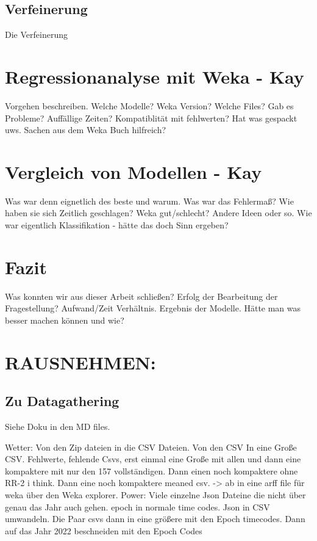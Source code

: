 \documentclass[letterpaper]{article} %
\begin{document}
    \subsection*{Verfeinerung}
        Die Verfeinerung
\section*{Regressionanalyse mit Weka - Kay}
    Vorgehen beschreiben. Welche Modelle? Weka Version? Welche Files? Gab es Probleme? Auffällige Zeiten? Kompatiblität mit fehlwerten? Hat was gespackt uws. Sachen aus dem Weka Buch hilfreich?
\section*{Vergleich von Modellen - Kay}
    Was war denn eignetlich des beste und warum. Was war das Fehlermaß? Wie haben sie sich Zeitlich geschlagen? Weka gut/schlecht? Andere Ideen oder so. Wie war eigentlich Klassifikation - hätte das doch Sinn ergeben?
\section*{Fazit}
    Was konnten wir aus dieser Arbeit schließen? Erfolg der Bearbeitung der Fragestellung? Aufwand/Zeit Verhältnis. Ergebnis der Modelle. Hätte man was besser machen können und wie?
    


\section{RAUSNEHMEN:}

\subsection*{Zu Datagathering}        

Siehe Doku in den MD files.
    
Wetter: Von den Zip dateien in die CSV Dateien. Von den CSV In eine Große CSV. Fehlwerte, fehlende Csvs, erst einmal eine Große mit allen und dann eine kompaktere mit nur den 157 vollständigen. Dann einen  noch kompaktere ohne RR-2 i think. Dann eine noch kompaktere meaned csv. -> ab in eine arff file für weka über den Weka explorer.
Power: Viele einzelne Json Dateine die nicht über genau das Jahr auch gehen. epoch in normale time codes. Json in CSV umwandeln. Die Paar csvs dann in eine größere mit den Epoch timecodes. Dann auf das Jahr 2022 beschneiden mit den Epoch Codes
\end{document}
